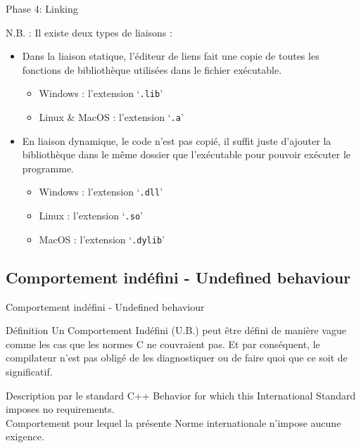 \begin{frame}{Phase 4: Linking}
	\begin{alertblock}{N.B. :}
		Il existe deux types de liaisons :
		\begin{itemize}
			\item Dans la \alert{liaison statique}, l'éditeur de liens fait une copie de toutes les fonctions de bibliothèque utilisées dans le fichier exécutable.
			\begin{itemize}
				\item Windows : l'extension `\texttt{.lib}'
				\item Linux \& MacOS : l'extension `\texttt{.a}'
			\end{itemize}
			\item En \alert{liaison dynamique}, le code n'est pas copié, il suffit juste d'ajouter la bibliothèque dans le même dossier que l'exécutable pour pouvoir exécuter le programme.
			\begin{itemize}
				\item Windows : l'extension `\texttt{.dll}'
				\item Linux : l'extension `\texttt{.so}'
				\item MacOS : l'extension `\texttt{.dylib}'
			\end{itemize}
		\end{itemize}
	\end{alertblock}
\end{frame}

\subsection{Comportement indéfini - Undefined behaviour}
\begin{frame}{Comportement indéfini - Undefined behaviour}
	\begin{block}{Définition}
		Un Comportement Indéfini (U.B.) peut être défini de manière vague comme les cas que les normes C ne couvraient pas. Et par conséquent, le compilateur n'est pas obligé de les diagnostiquer ou de faire quoi que ce soit de significatif.
	\end{block}
	\begin{block}{Description par le standard C++}
		Behavior for which this International Standard imposes no requirements. \\
		Comportement pour lequel la présente Norme internationale n'impose aucune exigence.
	\end{block}
\end{frame}

